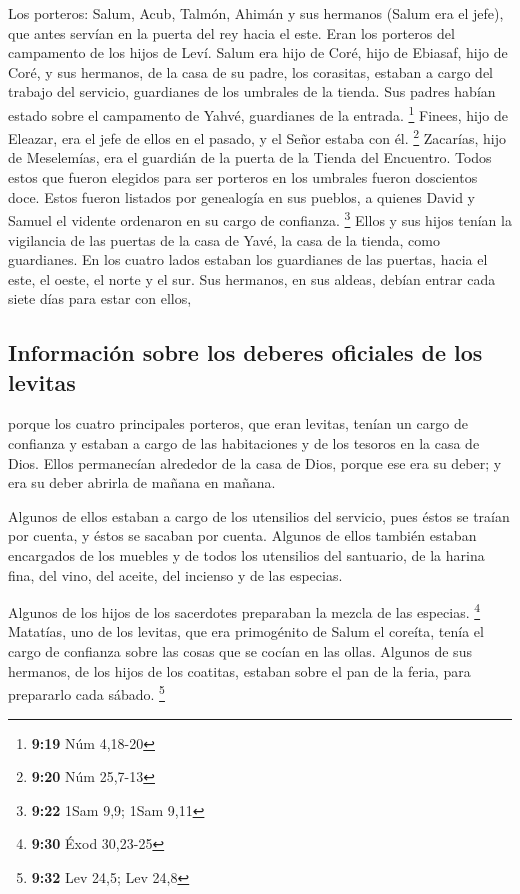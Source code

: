 \begin{paracol}{2}
 Los porteros: Salum, Acub, Talmón, Ahimán y sus hermanos
(Salum era el jefe),  que antes servían en la puerta del
rey hacia el este. Eran los porteros del campamento de los hijos de
Leví.  Salum era hijo de Coré, hijo de Ebiasaf, hijo de
Coré, y sus hermanos, de la casa de su padre, los corasitas, estaban a
cargo del trabajo del servicio, guardianes de los umbrales de la tienda.
Sus padres habían estado sobre el campamento de Yahvé, guardianes de la
entrada. \footnote{\textbf{9:19} Núm 4,18-20}  Finees,
hijo de Eleazar, era el jefe de ellos en el pasado, y el Señor estaba
con él. \footnote{\textbf{9:20} Núm 25,7-13}  Zacarías,
hijo de Meselemías, era el guardián de la puerta de la Tienda del
Encuentro.  Todos estos que fueron elegidos para ser
porteros en los umbrales fueron doscientos doce. Estos fueron listados
por genealogía en sus pueblos, a quienes David y Samuel el vidente
ordenaron en su cargo de confianza. \footnote{\textbf{9:22} 1Sam 9,9;
  1Sam 9,11}  Ellos y sus hijos tenían la vigilancia de
las puertas de la casa de Yavé, la casa de la tienda, como guardianes.
 En los cuatro lados estaban los guardianes de las
puertas, hacia el este, el oeste, el norte y el sur.  Sus
hermanos, en sus aldeas, debían entrar cada siete días para estar con
ellos,

\hypertarget{informaciuxf3n-sobre-los-deberes-oficiales-de-los-levitas}{%
\subsection{Información sobre los deberes oficiales de los
levitas}\label{informaciuxf3n-sobre-los-deberes-oficiales-de-los-levitas}}

 porque los cuatro principales porteros, que eran
levitas, tenían un cargo de confianza y estaban a cargo de las
habitaciones y de los tesoros en la casa de Dios.  Ellos
permanecían alrededor de la casa de Dios, porque ese era su deber; y era
su deber abrirla de mañana en mañana.

 Algunos de ellos estaban a cargo de los utensilios del
servicio, pues éstos se traían por cuenta, y éstos se sacaban por
cuenta.  Algunos de ellos también estaban encargados de
los muebles y de todos los utensilios del santuario, de la harina fina,
del vino, del aceite, del incienso y de las especias.

 Algunos de los hijos de los sacerdotes preparaban la
mezcla de las especias. \footnote{\textbf{9:30} Éxod 30,23-25}
 Matatías, uno de los levitas, que era primogénito de
Salum el coreíta, tenía el cargo de confianza sobre las cosas que se
cocían en las ollas.  Algunos de sus hermanos, de los
hijos de los coatitas, estaban sobre el pan de la feria, para prepararlo
cada sábado. \footnote{\textbf{9:32} Lev 24,5; Lev 24,8}


\end{paracol}

